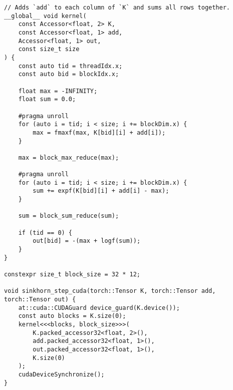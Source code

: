\begin{lstlisting}
// Adds `add` to each column of `K` and sums all rows together.
__global__ void kernel(
    const Accessor<float, 2> K,
    const Accessor<float, 1> add,
    Accessor<float, 1> out,
    const size_t size
) {
    const auto tid = threadIdx.x;
    const auto bid = blockIdx.x;

    float max = -INFINITY;
    float sum = 0.0;

    #pragma unroll
    for (auto i = tid; i < size; i += blockDim.x) {
        max = fmaxf(max, K[bid][i] + add[i]);
    }

    max = block_max_reduce(max);

    #pragma unroll
    for (auto i = tid; i < size; i += blockDim.x) {
        sum += expf(K[bid][i] + add[i] - max);
    }

    sum = block_sum_reduce(sum);

    if (tid == 0) {
        out[bid] = -(max + logf(sum));
    }
}

constexpr size_t block_size = 32 * 12;

void sinkhorn_step_cuda(torch::Tensor K, torch::Tensor add, torch::Tensor out) {
    at::cuda::CUDAGuard device_guard(K.device());
    const auto blocks = K.size(0);
    kernel<<<blocks, block_size>>>(
        K.packed_accessor32<float, 2>(),
        add.packed_accessor32<float, 1>(),
        out.packed_accessor32<float, 1>(),
        K.size(0)
    );
    cudaDeviceSynchronize();
}
\end{lstlisting}